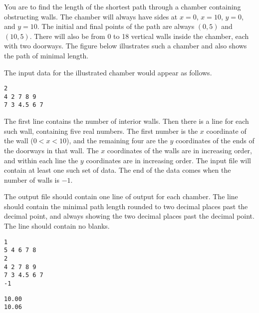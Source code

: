 


\pagestyle{contest}


\maketitle


You are to find the length of the shortest path through a chamber
containing obstructing walls.  The chamber will always have sides at
$x=0$, $x=10$, $y=0$, and $y=10$.  The initial and final points of the
path are always $(0,5)$ and $(10,5)$.  There will also be from 0 to 18
vertical walls inside the chamber, each with two doorways.  The figure
below illustrates such a chamber and also shows the path of minimal
length.


\bigskip
{}

The input data for the illustrated chamber would appear as follows.

\begin{verbatim}
2
4 2 7 8 9
7 3 4.5 6 7
\end{verbatim}

The first line contains the number of interior walls.  Then there is a
line for each such wall, containing five real numbers.  The first
number is the $x$ coordinate of the wall ($0<x<10$), and the remaining four are
the $y$ coordinates of the ends of the doorways in that wall.  The $x$
coordinates of the walls are in increasing order, and within each line
the $y$ coordinates are in increasing order.  The input file will
contain at least one such set of data.  The end of the data comes when
the number of walls is $-1$.

The output file should contain one line of output for each chamber.
The line should contain the minimal path length rounded to two decimal
places past the decimal point, and always showing the two decimal
places past the decimal point.  The line should contain no blanks.
    
\bigskip
{}

{\small
\begin{verbatim}
1
5 4 6 7 8
2
4 2 7 8 9
7 3 4.5 6 7
-1
\end{verbatim}
}

\bigskip
{}

{\small
\begin{verbatim}
10.00
10.06
\end{verbatim}
}



